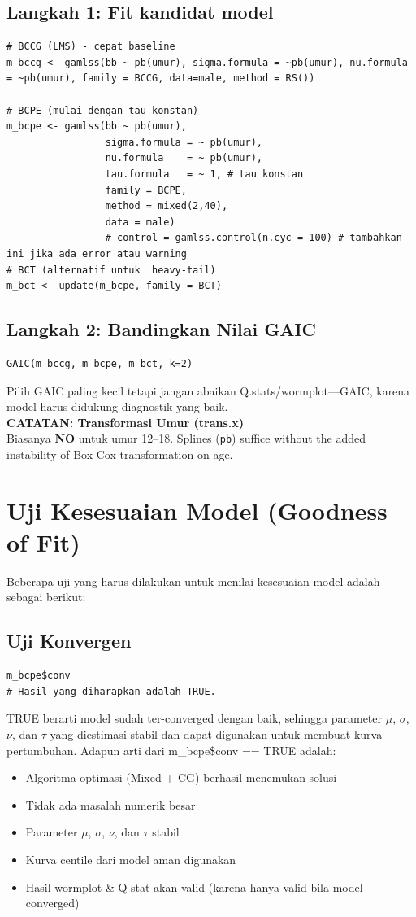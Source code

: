 \documentclass[11pt, a4paper]{article}
\begin{document}
\subsection{Langkah 1: Fit kandidat model}
\begin{lstlisting}
# BCCG (LMS) - cepat baseline
m_bccg <- gamlss(bb ~ pb(umur), sigma.formula = ~pb(umur), nu.formula = ~pb(umur), family = BCCG, data=male, method = RS())

# BCPE (mulai dengan tau konstan)
m_bcpe <- gamlss(bb ~ pb(umur),
                 sigma.formula = ~ pb(umur),
                 nu.formula    = ~ pb(umur),
                 tau.formula   = ~ 1, # tau konstan
                 family = BCPE,
                 method = mixed(2,40),
                 data = male)
                 # control = gamlss.control(n.cyc = 100) # tambahkan ini jika ada error atau warning
# BCT (alternatif untuk  heavy-tail)
m_bct <- update(m_bcpe, family = BCT)
\end{lstlisting}

\subsection{Langkah 2: Bandingkan Nilai GAIC}
\begin{lstlisting}
GAIC(m_bccg, m_bcpe, m_bct, k=2)
\end{lstlisting}
Pilih GAIC paling kecil tetapi jangan abaikan Q.stats/wormplot—GAIC, karena model harus didukung diagnostik yang baik.\\

\noindent
\textbf{CATATAN: Transformasi Umur (trans.x)}\\
Biasanya \textbf{NO} untuk umur 12--18. Splines (\texttt{pb}) suffice without the added instability of Box-Cox transformation on age.

\section{Uji Kesesuaian Model (Goodness of Fit)}
Beberapa uji yang harus dilakukan untuk menilai kesesuaian model adalah sebagai berikut:
\subsection{Uji Konvergen}
\begin{lstlisting}
m_bcpe$conv
# Hasil yang diharapkan adalah TRUE.
\end{lstlisting}
TRUE berarti model sudah ter-converged dengan baik, sehingga parameter $\mu$, $\sigma$, $\nu$, dan $\tau$ yang diestimasi stabil dan dapat digunakan untuk membuat kurva pertumbuhan. Adapun arti dari m\_bcpe\$conv == TRUE adalah:
\begin{itemize}
\item Algoritma optimasi (Mixed + CG) berhasil menemukan solusi
\item Tidak ada masalah numerik besar
\item Parameter $\mu$, $\sigma$, $\nu$, dan $\tau$ stabil
\item Kurva centile dari model aman digunakan
\item Hasil wormplot \& Q-stat akan valid (karena hanya valid bila model converged)
\end{itemize}
\end{document}
